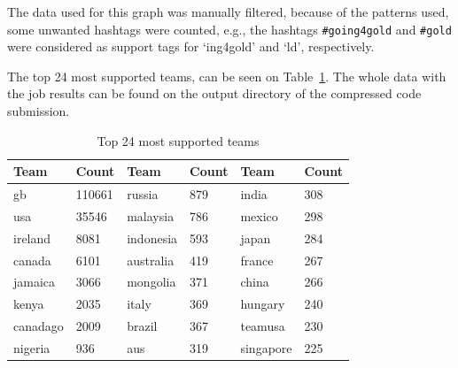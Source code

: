 \documentclass[10pt,a4paper]{article}
\begin{document}
The data used for this graph was manually filtered, because of the patterns
used, some unwanted hashtags were counted, e.g., the hashtags {\tt \#going4gold}
and {\tt \#gold} were considered as support tags for `ing4gold' and `ld',
respectively.

The top 24 most supported teams, can be seen on Table~\ref{tab::hashtag}. The
whole data with the job results can be found on the output directory of the
compressed code submission.

\begin{table}[t]
    \centering
    \caption{Top 24 most supported teams}\label{tab::hashtag}
    \begin{tabular}{|l|l||l|l||l|l|}
        \hline
        Team & Count & Team & Count & Team & Count \\
        \hline\hline
        gb        & 110661 & russia    & 879 & india     & 308  \\
        usa       & 35546  & malaysia  & 786 & mexico    & 298  \\
        ireland   & 8081   & indonesia & 593 & japan     & 284  \\
        canada    & 6101   & australia & 419 & france    & 267  \\
        jamaica   & 3066   & mongolia  & 371 & china     & 266  \\
        kenya     & 2035   & italy     & 369 & hungary   & 240  \\
        canadago  & 2009   & brazil    & 367 & teamusa   & 230  \\
        nigeria   & 936    & aus       & 319 & singapore & 225  \\
        \hline
    \end{tabular}
\end{table}
\end{document}
